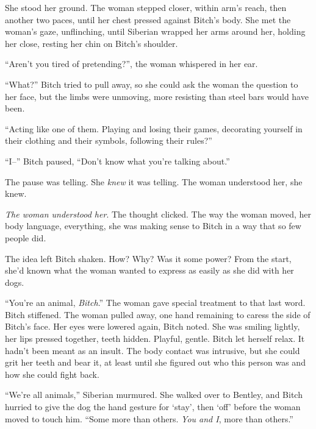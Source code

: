 She stood her ground.  The woman stepped closer, within arm's reach, then another two paces, until her chest pressed against Bitch's body.  She met the woman's gaze, unflinching, until Siberian wrapped her arms around her, holding her close, resting her chin on Bitch's shoulder.



``Aren't you tired of pretending?'', the woman whispered in her ear.



``What?''  Bitch tried to pull away, so she could ask the woman the question to her face, but the limbs were unmoving, more resisting than steel bars would have been.



``Acting like one of them.  Playing and losing their games, decorating yourself in their clothing and their symbols, following their rules?''



``I--'' Bitch paused, ``Don't know what you're talking about.''



The pause was telling.  She \emph{knew} it was telling.  The woman understood her, she knew.



\emph{The woman understood her}.  The thought clicked.  The way the woman moved, her body language, everything, she was making sense to Bitch in a way that so few people did.



The idea left Bitch shaken.  How?  Why?  Was it some power?  From the start, she'd known what the woman wanted to express as easily as she did with her dogs.



``You're an animal, \emph{Bitch}.'' The woman gave special treatment to that last word.  Bitch stiffened.  The woman pulled away, one hand remaining to caress the side of Bitch's face.  Her eyes were lowered again, Bitch noted.  She was smiling lightly, her lips pressed together, teeth hidden.  Playful, gentle.  Bitch let herself relax.  It hadn't been meant as an insult.  The body contact was intrusive, but she could grit her teeth and bear it, at least until she figured out who this person was and how she could fight back.



``We're all animals,'' Siberian murmured.  She walked over to Bentley, and Bitch hurried to give the dog the hand gesture for `stay', then `off' before the woman moved to touch him.  ``Some more than others.  \emph{You and I}, more than others.''




